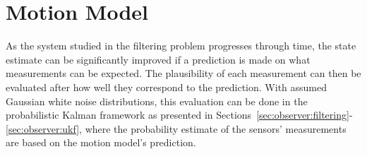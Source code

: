 \section{Motion Model}
\label{sec:observer:motionmodel}
    As the system studied in the filtering problem progresses through time,
    the state estimate can be significantly improved if a prediction
    is made on what measurements can be expected. The plausibility
    of each measurement can then be evaluated after how well they correspond to the prediction.
    With assumed Gaussian white noise distributions, this evaluation
    can be done in the probabilistic Kalman framework as presented in
    Sections~\ref{sec:observer:filtering}-\ref{sec:observer:ukf}, where the
    probability estimate of the sensors' measurements are based on the motion
    model's prediction.

